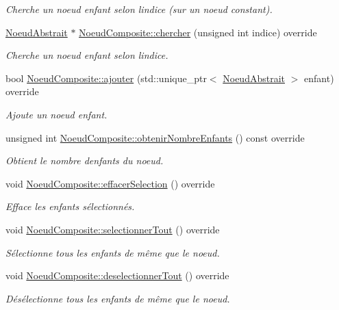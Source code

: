 \begin{DoxyCompactItemize}
\begin{DoxyCompactList}\small\item\em Cherche un noeud enfant selon l\textquotesingle{}indice (sur un noeud constant). \end{DoxyCompactList}\item 
\hyperlink{class_noeud_abstrait}{Noeud\+Abstrait} $\ast$ \hyperlink{group__inf2990_ga9f6cf297ac93d75711e1ae85cb0a69ed}{Noeud\+Composite\+::chercher} (unsigned int indice) override
\begin{DoxyCompactList}\small\item\em Cherche un noeud enfant selon l\textquotesingle{}indice. \end{DoxyCompactList}\item 
bool \hyperlink{group__inf2990_ga5651862ed875690375d9a82a06ecdcb2}{Noeud\+Composite\+::ajouter} (std\+::unique\+\_\+ptr$<$ \hyperlink{class_noeud_abstrait}{Noeud\+Abstrait} $>$ enfant) override
\begin{DoxyCompactList}\small\item\em Ajoute un noeud enfant. \end{DoxyCompactList}\item 
unsigned int \hyperlink{group__inf2990_ga4cb7898e88b8726f93dfe588105472d4}{Noeud\+Composite\+::obtenir\+Nombre\+Enfants} () const  override
\begin{DoxyCompactList}\small\item\em Obtient le nombre d\textquotesingle{}enfants du noeud. \end{DoxyCompactList}\item 
void \hyperlink{group__inf2990_ga7e3aa1018378eb5e0342b2fe530783cc}{Noeud\+Composite\+::effacer\+Selection} () override
\begin{DoxyCompactList}\small\item\em Efface les enfants sélectionnés. \end{DoxyCompactList}\item 
void \hyperlink{group__inf2990_ga1fb05aa01553f1fa6738711ab172efb6}{Noeud\+Composite\+::selectionner\+Tout} () override
\begin{DoxyCompactList}\small\item\em Sélectionne tous les enfants de même que le noeud. \end{DoxyCompactList}\item 
void \hyperlink{group__inf2990_ga98d6f93f7dc06301f8909e8cf31e3e9e}{Noeud\+Composite\+::deselectionner\+Tout} () override
\begin{DoxyCompactList}\small\item\em Désélectionne tous les enfants de même que le noeud. \end{DoxyCompactList}\item 

\end{DoxyCompactItemize}
